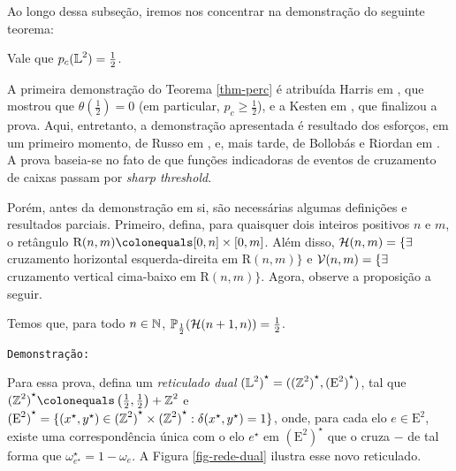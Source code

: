 \par Ao longo dessa subseção, iremos nos concentrar na demonstração do seguinte teorema:

\begin{mythm} \label{thm-perc}
	Vale que $p_c(\operatorname{\mathbb{L}}^2) = \frac{1}{2}$.
\end{mythm}

\par A primeira demonstração do Teorema \ref{thm-perc} é atribuída Harris em \cite{harris1960lower}, que mostrou que $\theta\left(\frac{1}{2}\right) = 0$ (em particular, $p_c \geq \frac{1}{2}$), e a Kesten em \cite{kesten1980critical}, que finalizou a prova. Aqui, entretanto, a demonstração apresentada é resultado dos esforços, em um primeiro momento, de Russo em \cite{russo1982approximate}, e, mais tarde, de Bollobás e Riordan em \cite{bollobas2006short}. A prova baseia-se no fato de que funções indicadoras de eventos de cruzamento de caixas passam por \textit{sharp threshold}.

\par Porém, antes da demonstração em si, são necessárias algumas definições e resultados parciais. Primeiro, defina, para quaisquer dois inteiros positivos $n$ e $m$, o retângulo $\text{R}(n, m) \colonequals [0, n] \times [0, m]$. Além disso, $\operatorname{\mathcal{H}}(n, m) = \{\exists$ cruzamento horizontal esquerda-direita em $\text{R}(n, m)\}$ e $\operatorname{\mathcal{V}}(n, m) = \{\exists$ cruzamento vertical cima-baixo em $\text{R}(n, m)\}$. Agora, observe a proposição a seguir.

\begin{mypro} \label{prop-rect-deg}
	Temos que, para todo $n \in \operatorname{\mathbb{N}}$, $\operatorname{\mathbb{P}}_{\frac{1}{2}}(\operatorname{\mathcal{H}}(n+1, n)) = \frac{1}{2}$.
\end{mypro}

\par \texttt{Demonstração:}

\par Para essa prova, defina um \textit{reticulado dual} ${(\operatorname{\mathbb{L}}^2)}^{\star} = ({(\operatorname{\mathbb{Z}}^2)}^{\star}, {(\text{E}^2)}^{\star})$, tal que ${(\ZX^2)}^{\star} \colonequals \left(\frac{1}{2}, \frac{1}{2}\right) + \ZX^2$ e ${(\text{E}^2)}^{\star} = \{(x^{\star}, y^{\star}) \in {(\operatorname{\mathbb{Z}}^2)}^{\star} \times {(\operatorname{\mathbb{Z}}^2)}^{\star}: \delta(x^{\star}, y^{\star}) = 1\}$, onde, para cada elo $e \in \text{E}^2$, existe uma correspondência única com o elo $e^{\star}$ em ${(\text{E}^2)}^{\star}$ que o cruza $-$ de tal forma que $\omega^{\star}_{e^{\star}} = 1 - \omega_e$. A Figura \ref{fig-rede-dual} ilustra esse novo reticulado.

